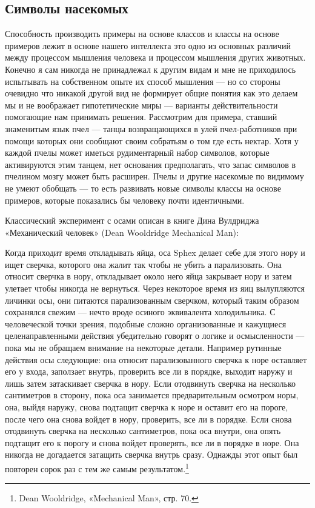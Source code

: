 \documentclass[../main.tex]{subfiles}
\begin{document}
\subsection{Символы насекомых}

Способность производить примеры на основе классов и классы на основе примеров лежит в основе нашего интеллекта это одно из основных различий между процессом мышления человека и процессом мышления других животных. Конечно я сам никогда не принадлежал к другим видам и мне не приходилось испытывать на собственном опыте их способ мышления --- но со стороны очевидно что никакой другой вид не формирует общие понятия как это делаем мы и не воображает гипотетические миры --- варианты действительности помогающие нам принимать решения. Рассмотрим для примера, ставший знаменитым язык пчел --- танцы возвращающихся в улей пчел-работников при помощи которых они сообщают своим собратьям о том где есть нектар. Хотя у каждой пчелы может иметься рудиментарный набор символов, которые активируются этим танцем, нет основания предполагать, что запас символов в пчелином мозгу может быть расширен. Пчелы и другие насекомые по видимому не умеют обобщать --- то есть развивать новые символы классы на основе примеров, которые показались бы человеку почти идентичными.

Классический эксперимент с осами описан в книге Дина Вулдриджа «Механический человек» (Dean Wooldridge Mechanical Man):

Когда приходит время откладывать яйца, оса Sphex делает себе для этого нору и ищет сверчка, которого она жалит так чтобы не убить а парализовать. Она относит сверчка в нору, откладывает около него яйца закрывает нору и затем улетает чтобы никогда не вернуться. Через некоторое время из яиц вылупляются личинки осы, они питаются парализованным сверчком, который таким образом сохранялся свежим --- нечто вроде осиного эквивалента холодильника. С человеческой точки зрения, подобные сложно организованные и кажущиеся целенаправленными действия убедительно говорят о логике и осмысленности --- пока мы не обращаем внимание на некоторые детали. Например рутинные действия осы следующие: она относит парализованного сверчка к норе оставляет его у входа, заползает внутрь, проверить все ли в порядке, выходит наружу и лишь затем затаскивает сверчка в нору. Если отодвинуть сверчка на несколько сантиметров в сторону, пока оса занимается предварительным осмотром норы, она, выйдя наружу, снова подтащит сверчка к норе и оставит его на пороге, после чего она снова войдет в нору, проверить, все ли в порядке. Если снова отодвинуть сверчка на несколько сантиметров, пока оса внутри, она опять подтащит его к порогу и снова войдет проверять, все ли в порядке в норе. Она никогда не догадается затащить сверчка внутрь сразу. Однажды этот опыт был повторен сорок раз с тем же самым результатом.\footnote{Dean Wooldridge, «Mechanical Man», стр. 70.}
\end{document}
